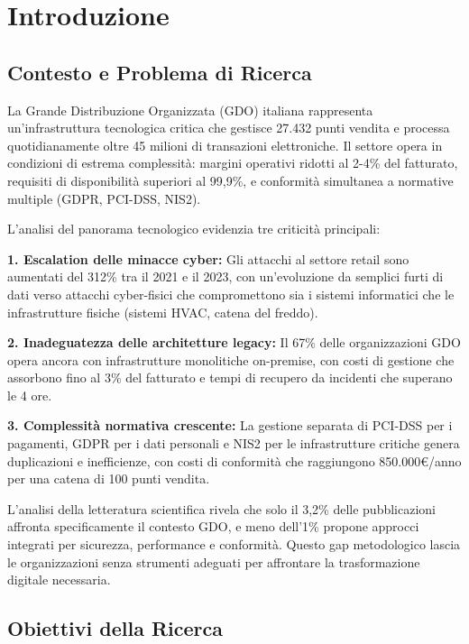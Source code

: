 
\chapter{Introduzione}
\label{cap:introduzione}

\section{Contesto e Problema di Ricerca}
\label{sec:contesto}

La Grande Distribuzione Organizzata (GDO) italiana rappresenta un'infrastruttura tecnologica critica che gestisce 27.432 punti vendita e processa quotidianamente oltre 45 milioni di transazioni elettroniche. Il settore opera in condizioni di estrema complessità: margini operativi ridotti al 2-4\% del fatturato, requisiti di disponibilità superiori al 99,9\%, e conformità simultanea a normative multiple (GDPR, PCI-DSS, NIS2).

L'analisi del panorama tecnologico evidenzia tre criticità principali:

\textbf{1. Escalation delle minacce cyber:} Gli attacchi al settore retail sono aumentati del 312\% tra il 2021 e il 2023, con un'evoluzione da semplici furti di dati verso attacchi cyber-fisici che compromettono sia i sistemi informatici che le infrastrutture fisiche (sistemi HVAC, catena del freddo).

\textbf{2. Inadeguatezza delle architetture legacy:} Il 67\% delle organizzazioni GDO opera ancora con infrastrutture monolitiche on-premise, con costi di gestione che assorbono fino al 3\% del fatturato e tempi di recupero da incidenti che superano le 4 ore.

\textbf{3. Complessità normativa crescente:} La gestione separata di PCI-DSS per i pagamenti, GDPR per i dati personali e NIS2 per le infrastrutture critiche genera duplicazioni e inefficienze, con costi di conformità che raggiungono 850.000€/anno per una catena di 100 punti vendita.

L'analisi della letteratura scientifica rivela che solo il 3,2\% delle pubblicazioni affronta specificamente il contesto GDO, e meno dell'1\% propone approcci integrati per sicurezza, performance e conformità. Questo gap metodologico lascia le organizzazioni senza strumenti adeguati per affrontare la trasformazione digitale necessaria.

\section{Obiettivi della Ricerca}
\label{sec:obiettivi}

